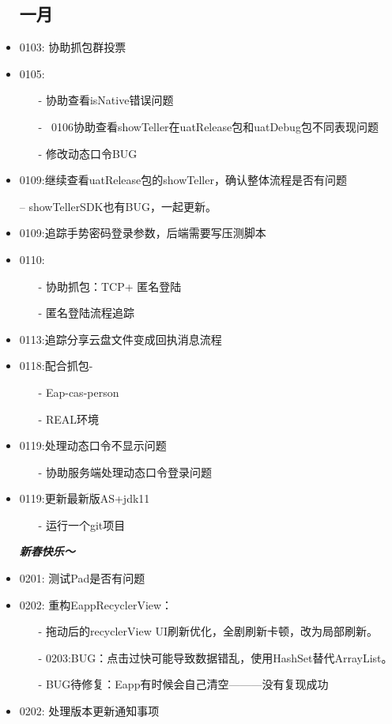 \documentclass[12pt,a4paper]{ctexart}
\begin{document}
\begin{itemize}
		\subsection{一月}
		\item 0103: 协助抓包群投票
		\item 0105:
		\begin{itemize}
			\item[-] 协助查看isNative错误问题
			\item[-] ~0106协助查看showTeller在uatRelease包和uatDebug包不同表现问题
			\item[-] 修改动态口令BUG
		\end{itemize}
		\item 0109:继续查看uatRelease包的showTeller，确认整体流程是否有问题
		\item[--] showTellerSDK也有BUG，一起更新。
		\item 0109:追踪手势密码登录参数，后端需要写压测脚本
		\newpage
		\item 0110:
		\begin{itemize}
			\item[-] 协助抓包：TCP+ 匿名登陆
			\item[-] 匿名登陆流程追踪
		\end{itemize}
		\item 0113:追踪分享云盘文件变成回执消息流程
		\item 0118:配合抓包-
		\begin{itemize}
			\item[-] Eap-cas-person
			\item[-] REAL环境
		\end{itemize}
		
		\item 0119:处理动态口令不显示问题
		\begin{itemize}
			\item[-] 协助服务端处理动态口令登录问题
		\end{itemize}
		\item 0119:更新最新版AS+jdk11
		\begin{itemize}
			\item[-] 运行一个git项目
		\end{itemize}
		\emph{\large{\textbf {新春快乐～}}}
		\item  0201: 测试Pad是否有问题
		\item 0202: 重构EappRecyclerView：
		\begin{itemize}
			\item[-] 拖动后的recyclerView UI刷新优化，全剧刷新卡顿，改为局部刷新。
			\item[-] 0203:BUG：点击过快可能导致数据错乱，使用HashSet替代ArrayList。
			\item[-] BUG待修复：Eapp有时候会自己清空———没有复现成功
		\end{itemize}
		\item 0202: 处理版本更新通知事项
		

\end{itemize}
\end{document}

